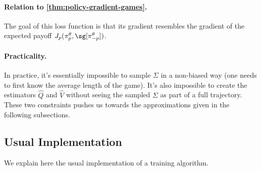 \documentclass[12pt, a4paper]{article}
\begin{document}
\paragraph{Relation to \autoref{thm:policy-gradient-games}.}
The goal of this loss function is that its gradient resembles the gradient of the expected payoff $J_p(\pi^\theta_p, \sg[\pi^\theta_{-p}])$.

\paragraph{Practicality.}
In practice, it's essentially impossible to sample $\Sigma$ in a non-biased way (one needs to first know the average length of the game).
It's also impossible to create the estimators $\widehat{Q}$ and $\widehat{V}$ without seeing the sampled $\Sigma$ as part of a full trajectory.
These two constraints pushes us towards the approximations given in the following subsections.

\subsection{Usual Implementation}\label{subsec:pg-usual-implementation}

We explain here the usual implementation of a training algorithm.

\begin{algorithm}[H]
\caption{$\mathfrak{T}\gets$~\texttt{SampleTerminal}$(\pi,N)$}
\label{alg:sample-terminal}
\DontPrintSemicolon
{}
\end{algorithm}
\end{document}
